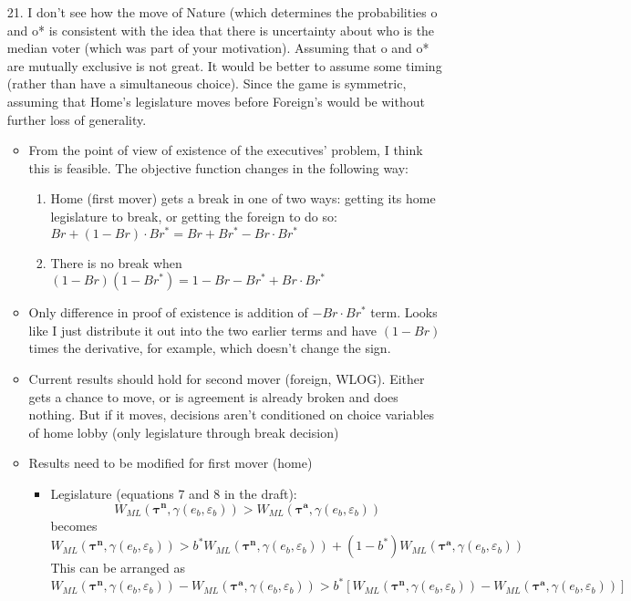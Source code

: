 \documentclass[12pt]{article}
\newcommand{\ve}{\varepsilon}
\newcommand{\bta}{\bm{\tau^a}}
\newcommand{\btn}{\bm{\tau^n}}
\newcommand{\ga}{\gamma}
\begin{document}
\begin{enumerate}
	\item[21.] I don’t see how the move of Nature (which determines the probabilities o and o* is consistent with the idea that there is uncertainty about who is the median voter (which was part of your motivation). Assuming that o and o* are mutually exclusive is not great. It would be better to assume some timing (rather than have a simultaneous choice). Since the game is symmetric, assuming that Home’s legislature moves before Foreign’s would be without further loss of generality.
		\begin{itemize}
			\item From the point of view of existence of the executives' problem, I think this is feasible. The objective function changes in the following way:
				\begin{enumerate}
					\item Home (first mover) gets a break in one of two ways: getting its home legislature to break, or getting the foreign to do so: $Br + (1-Br)\cdot Br^* = Br + Br^* - Br \cdot Br^*$
					\item There is no break when $(1-Br)(1-Br^*) = 1 - Br - Br^* + Br \cdot Br^*$
				\end{enumerate}
			\item Only difference in proof of existence is addition of $- Br \cdot Br^*$ term. Looks like I just distribute it out into the two earlier terms and have $(1 - Br)$ times the derivative, for example, which doesn't change the sign.
			\item Current results should hold for second mover (foreign, WLOG). Either gets a chance to move, or is agreement is already broken and does nothing. But if it moves, decisions aren't conditioned on choice variables of home lobby (only legislature through break decision)
			\item Results need to be modified for first mover (home)
				\begin{itemize}
					\item Legislature (equations 7 and 8 in the draft):
						\begin{equation}
							W_{ML}(\btn,\ga(e_b,\ve_b)) > W_{ML}\left(\bta,\ga(e_b,\ve_b)\right)
							\label{eq:lwcg}
						\end{equation}
						becomes
						\[ 
						  W_{ML}(\btn,\ga(e_b,\ve_b)) > b^* W_{ML}\left(\btn,\ga(e_b,\ve_b)\right) + (1-b^*) W_{ML}\left(\bta,\ga(e_b,\ve_b)\right)
						\]
						This can be arranged as 
						\[ 
						  W_{ML}(\btn,\ga(e_b,\ve_b)) - W_{ML}(\bta,\ga(e_b,\ve_b)) > b^* \left[ W_{ML}\left(\btn,\ga(e_b,\ve_b)\right) - W_{ML}\left(\bta,\ga(e_b,\ve_b)\right) \right]
\]
\end{itemize}
\end{itemize}
\end{enumerate}
\end{document}
